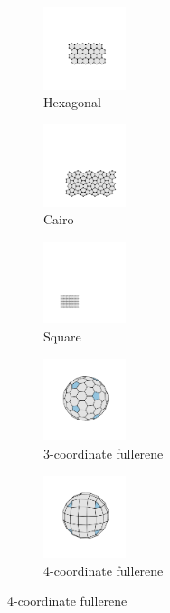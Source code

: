 \begin{figure}[bt]
     \centering
     
     \begin{subfigure}[b]{0.3\textwidth}
         \centering
         \includegraphics[height=2.4cm]{./figures/methods/hex.pdf}
         \caption{Hexagonal}
         \label{fig:latticeshex}
     \end{subfigure}
     \hfill
     \begin{subfigure}[b]{0.3\textwidth}
         \centering
         \includegraphics[height=2.4cm]{./figures/methods/cai.pdf}
         \caption{Cairo}
         \label{fig:latticescairo}
     \end{subfigure}
     \hfill
	\begin{subfigure}[b]{0.3\textwidth}
         \centering
         \includegraphics[height=2.4cm]{./figures/methods/sq.pdf}
         \caption{Square}
         \label{fig:latticessq}
     \end{subfigure}
     \hfill
     \vspace{0.5cm}
     
       \begin{subfigure}[b]{0.45\textwidth}
         \centering
         \includegraphics[height=2.4cm]{./figures/methods/full92.pdf}
         \caption{3\--coordinate fullerene}
         \label{fig:latticesfull92}
     \end{subfigure}
     \hspace{1cm}
     \begin{subfigure}[b]{0.45\textwidth}
         \centering
         \includegraphics[height=2.4cm]{./figures/methods/full98.pdf}
         \caption{4\--coordinate fullerene}
         \label{fig:latticesfull98}
     \end{subfigure}
     

\end{figure}
